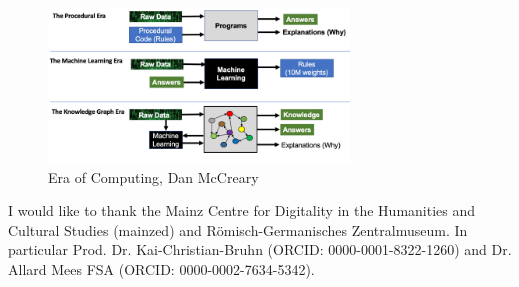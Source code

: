 \documentclass[twocolumn]{autart}
\begin{document}
\begin{figure}[!htb]
\begin{center}
\includegraphics[width=8cm]{1_78b9DR1EApGRAst5FkPrwQ.png}    %
\caption{Era of Computing, Dan McCreary \cite{mccreary_computing}}  %
\label{figeoco}                                 %
\end{center}                                 %
\end{figure}

\begin{ack}                               
I would like to thank the Mainz Centre for Digitality in the Humanities and Cultural Studies (mainzed) and R\"omisch-Germanisches Zentralmuseum. In particular Prod. Dr. Kai-Christian-Bruhn (ORCID: 0000-0001-8322-1260) and Dr. Allard Mees FSA (ORCID: 0000-0002-7634-5342).
\end{ack}

\end{document}
